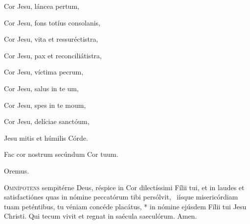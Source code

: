 \begin{hangparas}{1em}{1}
Cor Jesu, láncea pertum,

Cor Jesu, fons totíus consolanis,

Cor Jesu, vita et ressuréctistra,

Cor Jesu, pax et reconciliátistra,

Cor Jesu, víctima pecrum,

Cor Jesu, salus in te um,

Cor Jesu, spes in te moum,

Cor Jesu, delíciae sanctóum,

\end{hangparas}


\smallskip

\begin{hangparas}{1em}{-1}
\parskip0mm
\Vbar Jesu mitis et húmilis Córde.

\Rbar Fac cor nostrum secúndum Cor tuum.
\end{hangparas}


{\centering Oremus.\par}


\lettrine{O}{mnípotens} sempitérne Deus, réspice in Cor dilectíssimi Fílii tui, 
et in laudes et satisfactiónes quas in nómine peccatórum tibi persólvit, \dag\ 
iísque misericórdiam tuam peténtibus, tu véniam concéde placátus, *
in nómine ejúsdem Fílii tui Jesu Christi.
Qui tecum vivit et regnat in saécula saeculórum. \Rbar Amen.


